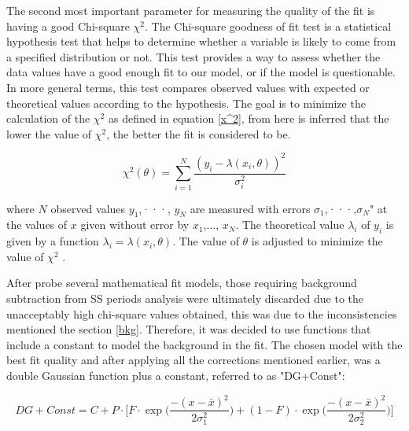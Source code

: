 The second most important parameter for measuring the quality of the fit is having a good  Chi-square $\chi^2$.  The  Chi-square goodness of fit test is a statistical hypothesis test that helps to determine whether a variable is likely to come from a specified distribution or not. This test provides a way to assess whether the data values have a good enough fit to our model, or if the model is questionable. In more general terms, this test compares observed values with expected or theoretical values according to the hypothesis. The goal is to minimize the calculation of the $\chi^2$ as defined in equation \ref{x^2}, from here is  inferred that the lower the value of $\chi^2$, the better the fit is considered to be.

\begin{equation}
\chi^{2}(\theta)=\sum_{i=1}^{N} \frac{(y_{i}-\lambda(x_{i},\theta))^{2}}{\sigma_{i}^{2}}
\label{x^2}
\end{equation}

where $N$ observed values $y_{1}$,···, $y_{N}$ are measured with errors $\sigma_{1}$,···,$\sigma_{N}$" at the values of $x$ given without error by $x_{1}$,..., $x_{N}$. The theoretical  value $\lambda_{i}$ of $y_{i}$ is given by a function $\lambda_{i} = \lambda(x_{i},\theta)$. The value of $\theta$ is adjusted to minimize the value of $\chi^2$ \cite{Statistical_Data_Analysis}.

After probe  several mathematical fit models, those requiring background subtraction from SS periods analysis were ultimately discarded due to the unacceptably high chi-square values obtained, this was due to the inconsistencies mentioned the section \ref{bkg}. Therefore, it was decided to use functions that include a constant to model the background in the fit. The chosen model with the best fit quality and after applying all the corrections mentioned earlier, was a double Gaussian function plus a constant, referred to as "DG+Const":

\begin{equation}
DG+Const= C+P \cdot \Biggl[ F \cdot \exp \Biggl( \frac{-(x-\bar{x})^{2}}{2 \sigma_{1}^{2} } \Biggr) + (1-F) \cdot \exp \Biggl( \frac{-(x-\bar{x})^{2}}{2 \sigma_{2}^{2} } \Biggr) \Biggr] 
\end{equation}

